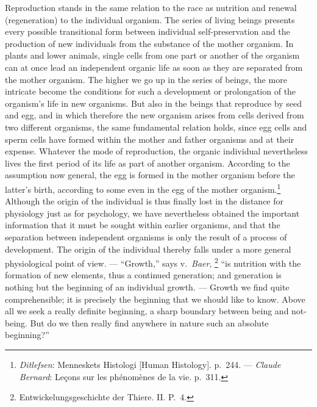 \documentclass[12pt,a4paper]{book}
\newcommand{\opage}[1]{\marginnote{\footnotesize\textit{[#1]}}}
\begin{document}
\opage{297}Reproduction stands in the same relation to the race as
nutrition and renewal (regeneration) to the individual organism. The
series of living beings presents every possible transitional form
between individual self-preservation and the production of new
individuals from the substance of the mother organism. In plants and
lower animals, single cells from one part or another of the organism can
at once lead an independent organic life as soon as they are separated
from the mother organism. The higher we go up in the series of beings,
the more intricate become the conditions for such a development or
prolongation of the organism's life in new organisms. But also in the
beings that reproduce by seed and egg, and in which therefore the new
organism arises from cells derived from two different organisms, the
same fundamental relation holds, since egg cells and sperm cells have
formed within the mother and father organisms and at their expense.
Whatever the mode of reproduction, the organic individual nevertheless
lives the first period of its life as part of another organism.
According to the assumption now general, the egg is formed in the mother
organism before the latter's birth, according to some even in
the egg of the mother organism.\footnote{\emph{Ditlefsen}: Menneskets
Histologi [Human Histology]. p.~244. --- \emph{Claude Bernard}: Leçons
sur les phénomènes de la vie. p.~311.} Although the origin of the
individual is thus finally lost in the distance for physiology just as
for psychology, we have nevertheless obtained the important information
that it must be sought within earlier organisms, and that the separation
between independent organisms is only the result of a process of
development. The origin of the individual thereby falls under a more
general physiological point of view. --- ``Growth,'' says v.\
\emph{Baer},
\footnote{Entwickelungsgeschichte der Thiere. II. P.~4.} ``is nutrition
with the formation of new elements, thus a continued generation; and
generation is nothing but the beginning of an individual growth. ---
Growth we find quite comprehensible; it is precisely the beginning that
we should like to know. Above all we seek a really definite beginning, a
sharp boundary between being and not-being. But do we then really find
anywhere in nature such an absolute beginning?''
\end{document}
